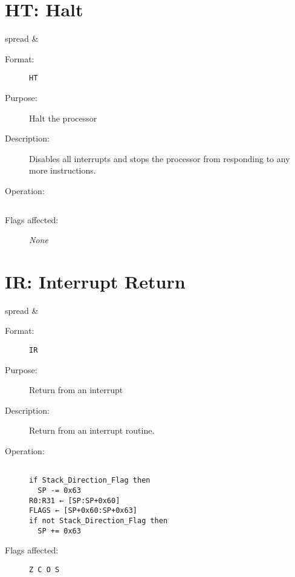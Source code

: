 \section{HT: Halt}
{
\setlength{\tabcolsep}{3pt}
\begin{tabu} spread \linewidth {l r}
 &  \\
\end{tabu}
}
\nopagebreak
\begin{description}
\item [Format:] \texttt{HT}
\item [Purpose:] Halt the processor
\item [Description:] Disables all interrupts and stops the processor from responding to any more instructions.

\item [Operation:] \begin{verbatim}
\end{verbatim}
\item [Flags affected:] \textit{None}
\end{description}
\vfill
\pagebreak[3]
\section{IR: Interrupt Return}
{
\setlength{\tabcolsep}{3pt}
\begin{tabu} spread \linewidth {l r}
 &  \\
\end{tabu}
}
\nopagebreak
\begin{description}
\item [Format:] \texttt{IR}
\item [Purpose:] Return from an interrupt
\item [Description:] Return from an interrupt routine.

\item [Operation:] \begin{verbatim}

if Stack_Direction_Flag then
  SP -= 0x63
R0:R31 ← [SP:SP+0x60]
FLAGS ← [SP+0x60:SP+0x63]
if not Stack_Direction_Flag then
  SP += 0x63\end{verbatim}
\item [Flags affected:] \texttt{Z C O S}
\end{description}
\vfill
\pagebreak[3]
